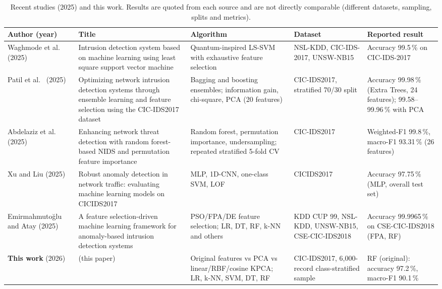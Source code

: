 \documentclass[runningheads]{llncs}
\begin{document}
\begin{table}[htbp]
\caption{Recent studies (2025) and this work. Results are quoted from each source and are not directly comparable (different datasets, sampling, splits and metrics).}\label{tab:lit}
\centering\scriptsize
\renewcommand{\arraystretch}{1.15}
\begin{tabular}{@{}>{\raggedright\arraybackslash}p{2.3cm}>{\raggedright\arraybackslash}p{3.3cm}>{\raggedright\arraybackslash}p{2.4cm}>{\raggedright\arraybackslash}p{1.7cm}>{\raggedright\arraybackslash}p{1.7cm}@{}}
\toprule
Author (year) & Title & Algorithm & Dataset & Reported result \\
\midrule
Waghmode et al.\ \cite{waghmode2025} (2025) & Intrusion detection system based on machine learning using least square support vector machine & Quantum-inspired LS-SVM with exhaustive feature selection & NSL-KDD, CIC-IDS-2017, UNSW-NB15 & Accuracy 99.5\,\% on CIC-IDS-2017 \\
Patil et al.\ \cite{patil2025} (2025) & Optimizing network intrusion detection systems through ensemble learning and feature selection using the CIC-IDS2017 dataset & Bagging and boosting ensembles; information gain, chi-square, PCA (20 features) & CIC-IDS2017, stratified 70/30 split & Accuracy 99.98\,\% (Extra Trees, 24 features); 99.58--99.96\,\% with PCA \\
Abdelaziz et al.\ \cite{abdelaziz2025} (2025) & Enhancing network threat detection with random forest-based NIDS and permutation feature importance & Random forest, permutation importance, undersampling; repeated stratified 5-fold CV & CIC-IDS2017 & Weighted-F1 99.8\,\%, macro-F1 93.31\,\% (26 features) \\
Xu and Liu \cite{xu2025} (2025) & Robust anomaly detection in network traffic: evaluating machine learning models on CICIDS2017 & MLP, 1D-CNN, one-class SVM, LOF & CICIDS2017 & Accuracy 97.75\,\% (MLP, overall test set) \\
Emirmahmuto\u{g}lu and Atay \cite{emirmahmutoglu2025} (2025) & A feature selection-driven machine learning framework for anomaly-based intrusion detection systems & PSO/FPA/DE feature selection; LR, DT, RF, k-NN and others & KDD CUP 99, NSL-KDD, UNSW-NB15, CSE-CIC-IDS2018 & Accuracy 99.9965\,\% on CSE-CIC-IDS2018 (FPA, RF) \\
\midrule
\textbf{This work} (2026) & (this paper) & Original features vs PCA vs linear/RBF/cosine KPCA; LR, k-NN, SVM, DT, RF & CIC-IDS2017, 6,000-record class-stratified sample & RF (original): accuracy 97.2\,\%, macro-F1 90.1\,\% \\
\bottomrule
\end{tabular}
\end{table}
\end{document}
